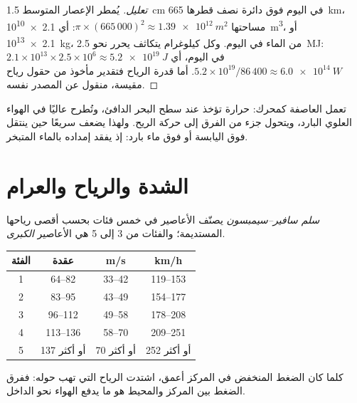 \begin{proof}[تعليل]
يُمطر الإعصار المتوسط \qty{1.5}{cm} في اليوم فوق دائرة نصف قطرها
\qty{665}{km}، مساحتها $\pi \times (665\,000)^2 \approx
\qty{1.39e12}{m^2}$: أي \qty{2.1e10}{m^3}، أو \qty{2.1e13}{kg}، من الماء في اليوم.
وكل كيلوغرام يتكاثف يحرر نحو \qty{2.5}{MJ}: $2.1\times10^{13}
\times 2.5\times10^6 \approx \qty{5.2e19}{J}$ في اليوم، أي
$5.2\times10^{19}/86\,400 \approx \qty{6.0e14}{W}$. أما قدرة الرياح فتقدير
مأخوذ من حقول رياح مقيسة، منقول عن المصدر نفسه.
\end{proof}

تعمل العاصفة كمحرك: حرارة تؤخذ عند سطح البحر الدافئ، وتُطرح عاليًا في الهواء العلوي
البارد، ويتحول جزء من الفرق إلى حركة الريح. ولهذا يضعف  سريعًا
حين ينتقل فوق اليابسة أو فوق ماء بارد: إذ يفقد إمداده بالماء المتبخر.

\section{الشدة والرياح والعرام}

\begin{definition}\label{def:g10:storms-and-cyclones:scale}
\emph{سلم سافير--سيمبسون} يصنّف الأعاصير في خمس
فئات بحسب أقصى رياحها المستديمة؛ والفئات من 3 إلى 5 هي الأعاصير
\emph{الكبرى}.
\end{definition}

\begin{center}
\small
\begin{tabular}{cccc}
\hline
الفئة & عقدة & \unit{m/s} & \unit{km/h} \\
\hline
1 & 64--82 & 33--42 & 119--153 \\
2 & 83--95 & 43--49 & 154--177 \\
3 & 96--112 & 49--58 & 178--208 \\
4 & 113--136 & 58--70 & 209--251 \\
5 & 137 أو أكثر & 70 أو أكثر & 252 أو أكثر \\
\hline
\end{tabular}
\end{center}

كلما كان الضغط المنخفض في المركز أعمق، اشتدت الرياح التي تهب حوله: ففرق الضغط بين
المركز والمحيط هو ما يدفع الهواء نحو الداخل.

